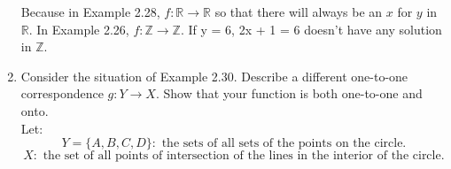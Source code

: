 \documentclass[12pt]{article}
\begin{document}
\begin{enumerate}
      Because in Example 2.28, $f:\mathds{R} \longrightarrow \mathds{R}$ so that there will always be an $x$ for $y$ in $\mathds{R}$.
      In Example 2.26, $f:\mathds{Z} \longrightarrow \mathds{Z}$. If y = 6, 2x + 1 = 6 doesn't have any solution in $\mathds{Z}$.
      \newpage
      \item Consider the situation of Example 2.30. Describe a different one-to-one correspondence $g: Y \longrightarrow X$. Show that your function is both one-to-one and onto.\\
      Let:
            \[Y = \{A,B,C,D\}: \text{ the sets of all sets of the points on the circle.}\]
            \[X: \text{ the set of all points of intersection of the lines in the interior of the circle.}\]

\end{enumerate}
\end{document}
